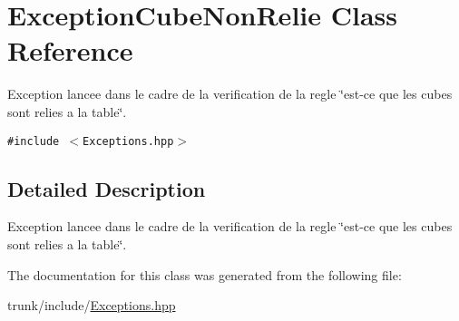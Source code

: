 \hypertarget{classExceptionCubeNonRelie}{
\section{ExceptionCubeNonRelie Class Reference}
\label{classExceptionCubeNonRelie}
}
Exception lancee dans le cadre de la verification de la regle \char`\"{}est-ce que les cubes sont relies a la table\char`\"{}.  


{\tt \#include $<$Exceptions.hpp$>$}



\subsection{Detailed Description}
Exception lancee dans le cadre de la verification de la regle \char`\"{}est-ce que les cubes sont relies a la table\char`\"{}. 

The documentation for this class was generated from the following file:\begin{CompactItemize}
\item 
trunk/include/\hyperlink{Exceptions_8hpp}{Exceptions.hpp}\end{CompactItemize}
